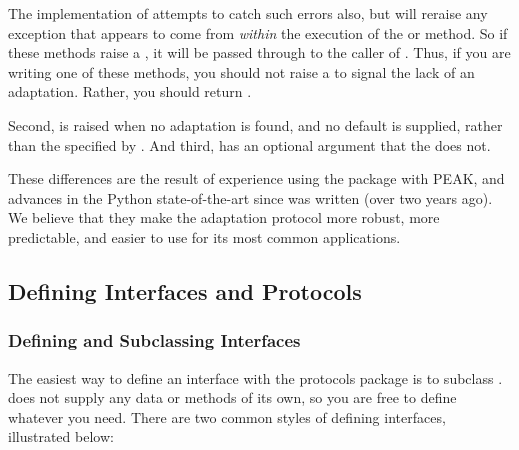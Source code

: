The  implementation of  attempts to catch
such errors also, but will reraise any exception that appears to come from
\emph{within} the execution of the  or
 method.  So if these methods raise a ,
it will be passed through to the caller of .  Thus, if you
are writing one of these methods, you should not raise a 
to signal the lack of an adaptation.  Rather, you should return .

Second,  is raised when no adaptation is
found, and no default is supplied, rather than the 
specified by .  And third,  has an optional
 argument that the   does not.

These differences are the result of experience using the 
package with PEAK, and advances in the Python state-of-the-art since
 was written (over two years ago).  We believe that they make the
adaptation protocol more robust, more predictable, and easier to use for
its most common applications.


\subsection{Defining Interfaces and Protocols \label{protocols-defining}}

\subsubsection{Defining and Subclassing Interfaces \label{interfaces-defining}}

The easiest way to define an interface with the protocols package is to subclass
.   does not supply any data or
methods of its own, so you are free to define whatever you need.  There are two
common styles of defining interfaces, illustrated below:

